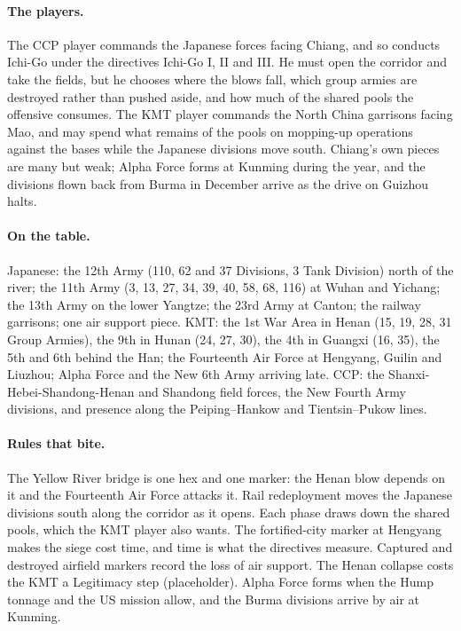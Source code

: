 \documentclass[11pt]{article}
\begin{document}
\paragraph{The players.} The CCP player commands the Japanese forces facing Chiang, and so conducts Ichi-Go under the directives Ichi-Go I, II and III. He must open the corridor and take the fields, but he chooses where the blows fall, which group armies are destroyed rather than pushed aside, and how much of the shared pools the offensive consumes. The KMT player commands the North China garrisons facing Mao, and may spend what remains of the pools on mopping-up operations against the bases while the Japanese divisions move south. Chiang's own pieces are many but weak; Alpha Force forms at Kunming during the year, and the divisions flown back from Burma in December arrive as the drive on Guizhou halts.
\paragraph{On the table.} Japanese: the 12th Army (110, 62 and 37 Divisions, 3 Tank Division) north of the river; the 11th Army (3, 13, 27, 34, 39, 40, 58, 68, 116) at Wuhan and Yichang; the 13th Army on the lower Yangtze; the 23rd Army at Canton; the railway garrisons; one air support piece. KMT: the 1st War Area in Henan (15, 19, 28, 31 Group Armies), the 9th in Hunan (24, 27, 30), the 4th in Guangxi (16, 35), the 5th and 6th behind the Han; the Fourteenth Air Force at Hengyang, Guilin and Liuzhou; Alpha Force and the New 6th Army arriving late. CCP: the Shanxi-Hebei-Shandong-Henan and Shandong field forces, the New Fourth Army divisions, and presence along the Peiping--Hankow and Tientsin--Pukow lines.
\paragraph{Rules that bite.} The Yellow River bridge is one hex and one marker: the Henan blow depends on it and the Fourteenth Air Force attacks it. Rail redeployment moves the Japanese divisions south along the corridor as it opens. Each phase draws down the shared pools, which the KMT player also wants. The fortified-city marker at Hengyang makes the siege cost time, and time is what the directives measure. Captured and destroyed airfield markers record the loss of air support. The Henan collapse costs the KMT a Legitimacy step (placeholder). Alpha Force forms when the Hump tonnage and the US mission allow, and the Burma divisions arrive by air at Kunming.
\clearpage
\end{document}
